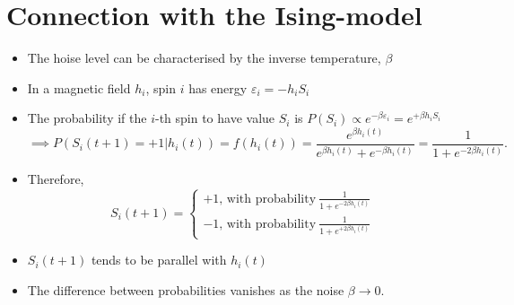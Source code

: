 \documentclass[12pt]{article}
\numberwithin{equation}{section}
\begin{document}
\section*{Connection with the Ising-model}
\begin{itemize}
    \item The hoise level can be characterised by the inverse temperature, $\beta$
    \item In a magnetic field $h_i$, spin $i$ has energy $\varepsilon_i = -h_iS_i$
    \item The probability if the $i$-th spin to have value $S_i$ is $P(S_i) \propto e^{-\beta\varepsilon_i} = e^{+\beta h_iS_i}$
    \begin{equation*}
        \implies P\left(S_i(t+1)=+1|h_i(t)\right) = f(h_i(t)) = \frac{e^{\beta h_i(t)}}{e^{\beta h_i(t)} + e^{-\beta h_i(t)}}
        = \frac{1}{1+e^{-2\beta h_i(t)}}.
    \end{equation*}
    \item Therefore,
    \begin{equation*}
        S_i(t+1) = \begin{cases}
            +1,\,\textrm{with probability}~\frac{1}{1+e^{-2\beta h_i(t)}}\\
            -1,\,\textrm{with probability}~\frac{1}{1+e^{+2\beta h_i(t)}}
        \end{cases}
    \end{equation*}
    \item $S_i(t+1)$ tends to be parallel with $h_i(t)$
    \item The difference between probabilities vanishes as the noise $\beta\rightarrow 0$.
\end{itemize}

\newpage
\end{document}
